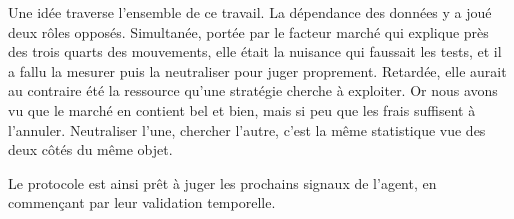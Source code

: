 Une idée traverse l'ensemble de ce travail. La dépendance des données y a joué
deux rôles opposés. Simultanée, portée par le facteur marché qui explique près
des trois quarts des mouvements, elle était la nuisance qui faussait les
tests, et il a fallu la mesurer puis la neutraliser pour juger proprement.
Retardée, elle aurait au contraire été la ressource qu'une stratégie cherche à
exploiter. Or nous avons vu que le marché en contient bel et bien, mais si peu
que les frais suffisent à l'annuler. Neutraliser l'une, chercher l'autre,
c'est la même statistique vue des deux côtés du même objet.

Le protocole est ainsi prêt à juger les prochains signaux de l'agent, en
commençant par leur validation temporelle.

\cleardoublepage
\printbibliography[heading=bibintoc]


